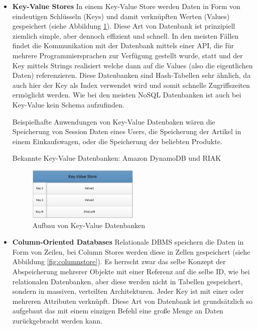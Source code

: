 \begin{itemize}
	\item \textbf{Key-Value Stores\newline}
	In einem Key-Value Store werden Daten in Form von eindeutigen Schlüsseln (Keys) und damit verknüpften Werten (Values) gespeichert (siehe Abbildung \ref{fig:keyvalue}). Diese Art von Datenbank ist prinzipiell ziemlich simple, aber dennoch effizient und schnell. In den meisten Fällen findet die Kommunikation mit der Datenbank mittels einer API, die für mehrere Programmiersprachen zur Verfügung gestellt wurde, statt und der Key mittels Strings realisiert welche dann auf die Values (also die eigentlichen Daten) referenzieren. Diese Datenbanken sind Hash-Tabellen sehr ähnlich, da auch hier der Key als Index verwendet wird und somit schnelle Zugriffszeiten ermöglicht werden. Wie bei den meisten NoSQL Datenbanken ist auch bei Key-Value kein Schema aufzufinden.

	Beispielhafte Anwendungen von Key-Value Datenbaken wären die Speicherung von Session Daten eines Users, die Speicherung der Artikel in einem Einkaufswagen, oder die Speicherung der beliebten Produkte.

	Bekannte Key-Value Datenbanken: Amazon DynamoDB und RIAK\nextline

	\begin{figure}[h]\centering
		\includegraphics[width=0.5\textwidth]{images/keyvalueStore}
		\caption{Aufbau von Key-Value Datenbanken}
		\label{fig:keyvalue}
	\end{figure}

	\item \textbf{Column-Oriented Databases\newline}
	Relationale DBMS speichern die Daten in Form von Zeilen, bei Column Stores werden diese in Zellen gespeichert (siehe Abbildung \ref{fig:columnstore}). Es herrscht zwar das selbe Konzept der Abspeicherung mehrerer Objekte mit einer Referenz auf die selbe ID, wie bei relationalen Datenbanken, aber diese werden nicht in Tabellen gespeichert, sondern in massiven, verteilten Architekturen. Jeder Key ist mit einer oder mehreren Attributen verknüpft. Diese Art von Datenbank ist grundsätzlich so aufgebaut das mit einem einzigen Befehl eine große Menge an Daten zurückgebracht werden kann. 


\end{itemize}
